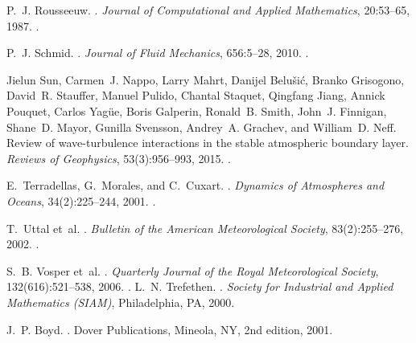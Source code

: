 P.~J. Rousseeuw.
.
\newblock \emph{Journal of Computational and Applied Mathematics}, 20:53--65, 1987.
\newblock {}.

P.~J. Schmid.
.
\newblock \emph{Journal of Fluid Mechanics}, 656:5--28, 2010.
\newblock {}.

Jielun Sun, Carmen~J. Nappo, Larry Mahrt, Danijel Belu\v{s}i\'{c}, Branko Grisogono, David~R. Stauffer, Manuel Pulido, Chantal Staquet, Qingfang Jiang, Annick Pouquet, Carlos Yag\"{u}e, Boris Galperin, Ronald~B. Smith, John~J. Finnigan, Shane~D. Mayor, Gunilla Svensson, Andrey~A. Grachev, and William~D. Neff.
\newblock Review of wave-turbulence interactions in the stable atmospheric boundary layer.
\newblock \emph{Reviews of Geophysics}, 53(3):956--993, 2015.
\newblock {}.

E.~Terradellas, G.~Morales, and C.~Cuxart.
.
\newblock \emph{Dynamics of Atmospheres and Oceans}, 34(2):225--244, 2001.
\newblock {}.

T.~Uttal et~al.
.
\newblock \emph{Bulletin of the American Meteorological Society}, 83(2):255--276, 2002.
\newblock {}.

S.~B. Vosper et~al.
.
\newblock \emph{Quarterly Journal of the Royal Meteorological Society}, 132(616):521--538, 2006.
\newblock {}.
L.~N. Trefethen.
.
\newblock \emph{Society for Industrial and Applied Mathematics (SIAM)},
  Philadelphia, PA, 2000.

J.~P. Boyd.
.
\newblock Dover Publications, Mineola, NY, 2nd edition, 2001.

